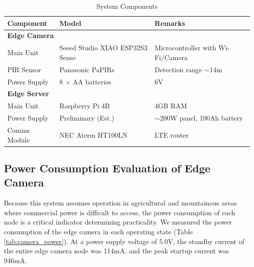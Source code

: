 \documentclass[conference]{IEEEtran}
\begin{document}
\begin{table}[tb]
    \caption{System Components}
    \label{tab:components}
        \begin{center}\footnotesize
    {\setlength{\tabcolsep}{3pt}
    \begin{tabular}{|p{}|p{}|p{}|}
        \hline
        \textbf{Component} & \textbf{Model} & \textbf{Remarks} \\
        \hline \hline
        \multicolumn{3}{|l|}{\textbf{Edge Camera}} \\
        \hline
        Main Unit & Seeed Studio XIAO ESP32S3 Sense & Microcontroller with Wi-Fi/Camera \\
        \hline
        PIR Sensor & Panasonic PaPIRs & Detection range $\sim$14m \\
        \hline
        Power Supply & 8 $\times$ AA batteries & 6V \\
        \hline \hline
        \multicolumn{3}{|l|}{\textbf{Edge Server}} \\
        \hline
        Main Unit & Raspberry Pi 4B & 4GB RAM \\
        \hline
        Power Supply & Preliminary (Est.) & $\sim$200W panel, 100Ah battery \\
        \hline
        Comms Module & NEC Aterm HT100LN & LTE router \\
        \hline
    \end{tabular}
    }
    \end{center}
    \end{table}

\subsection{Power Consumption Evaluation of Edge Camera}
Because this system assumes operation in agricultural and mountainous areas where commercial power is difficult to access, the power consumption of each node is a critical indicator determining practicality. We measured the power consumption of the edge camera in each operating state (Table \ref{tab:camera_power}). At a power supply voltage of 5.0V, the standby current of the entire edge camera node was 114mA, and the peak startup current was 946mA.

\begin{table}[tb]
    \caption{Power Consumption of Edge Camera (5.0V)}
    \label{tab:camera_power}
        \begin{center}\footnotesize
    \end{center}
    \end{table}
\end{document}
